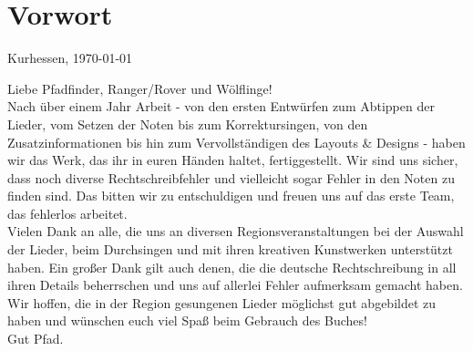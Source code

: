 \section*{Vorwort}

\begin{flushright} 
Kurhessen, \today
\end{flushright}

Liebe Pfadfinder, Ranger/Rover und Wölflinge! \\ 

Nach über einem Jahr Arbeit - von den ersten Entwürfen zum Abtippen der Lieder, vom Setzen der Noten bis zum Korrektursingen, von den Zusatzinformationen bis hin zum Vervollständigen des Layouts \& Designs - haben wir das Werk, das ihr in euren Händen haltet, fertiggestellt. Wir sind uns sicher, dass noch diverse Rechtschreibfehler und vielleicht sogar Fehler in den Noten zu finden sind. Das bitten wir zu entschuldigen und freuen uns auf das erste Team, das fehlerlos arbeitet. \\ 

Vielen Dank an alle, die uns an diversen Regionsveranstaltungen bei der Auswahl der Lieder, beim Durchsingen und mit ihren kreativen Kunstwerken unterstützt haben. Ein großer Dank gilt auch denen, die die deutsche Rechtschreibung in all ihren Details beherrschen und uns auf allerlei Fehler aufmerksam gemacht haben. \\

Wir hoffen, die in der Region gesungenen Lieder möglichst gut abgebildet zu haben und wünschen euch viel Spaß beim Gebrauch des Buches! \\ 

Gut Pfad.